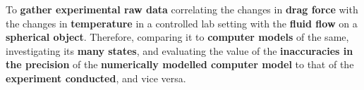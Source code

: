 {To \textbf{gather experimental raw data} correlating the changes in \textbf{drag force} with the changes in \textbf{temperature} in a controlled lab setting with the \textbf{fluid flow} on a \textbf{spherical object}. Therefore, comparing it to \textbf{computer models} of the same, investigating its \textbf{many states}, and evaluating the value of the \textbf{inaccuracies in the precision} of the \textbf{numerically modelled computer model} to that of the \textbf{experiment conducted}, and vice versa.}

